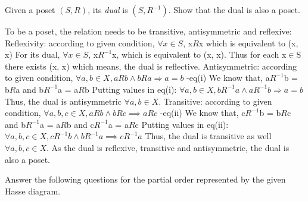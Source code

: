 \documentclass[addpoints]{exam}
\begin{document}
\begin{questions}
\question[5] Given a poset $(S, R)$, its \textit{dual} is $(S,R^{-1})$. Show that the dual is also a poset. 
  \begin{solution}
    To be a poset, the relation needs to be transitive, antisymmetric and reflexive: \newline
    Reflexivity: according to given condition, $\forall x \in S$, x$R$x which is equivalent to (x, x) \newline
    For its dual, $\forall x \in S$, x$R^{-1}$x, which is equivalent to (x, x). \newline
    Thus for each x$\in$S there exists (x, x) which means, the dual is reflective. \newline
    \newline
    Antisymmetric: according to given condition, $\forall a, b \in X, a R b \land b R a \Rightarrow a = b $ -eq(i)\newline
    We know that, a$R^{-1}$b = b$R$a and b$R^{-1}$a = a$R$b \newline
    Putting values in eq(i): $\forall a, b \in X, bR^{-1}a \land aR^{-1}b \Rightarrow a = b $ \newline
    Thus, the dual is antisymmetric $\forall a, b \in X$. \newline
    \newline
    Transitive: according to given condition, $\forall a, b, c \in X, a R b \land b R c \implies a R c$ -eq(ii)\newline
    We know that, c$R^{-1}$b = b$R$c and b$R^{-1}$a = a$R$b and c$R^{-1}$a = a$R$c\newline
    Putting values in eq(ii): $\forall a, b, c \in X, cR^{-1}b \land bR^{-1}a \implies  cR^{-1}a  $\newline
    Thus, the dual is transitive as well $\forall a, b, c \in X$. \newline
    \newline
    As the dual is reflexive, transitive and antisymmetric, the dual is also a poset.
  \end{solution}
  
\question Answer the following questions for the partial order represented by the given Hasse diagram.
  
  \begin{minipage}{.3\textwidth}
\end{minipage}
\end{questions}
\end{document}
